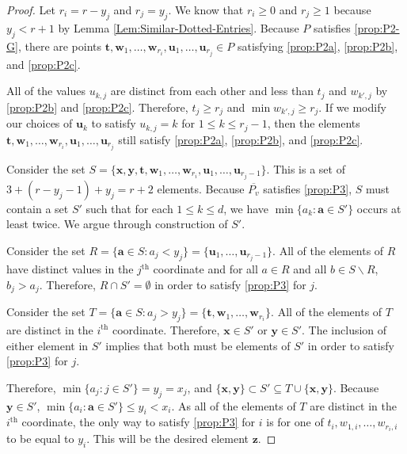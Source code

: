 \documentclass{amsart}
\begin{document}
	\begin{proof}
		Let $r_i = r - y_j$ and $r_j = y_j$. We know that $r_i \geq 0$ and $r_j \geq 1$ because $y_j < r+1$ by Lemma \ref{Lem:Similar-Dotted-Entries}. Because $P$ satisfies \ref{prop:P2-G}, there are points $\mathbf{t}, \mathbf{w}_1, \ldots, \mathbf{w}_{r_i}, \mathbf{u}_1, \ldots, \mathbf{u}_{r_j} \in P$ satisfying \ref{prop:P2a}, \ref{prop:P2b}, and \ref{prop:P2c}.
		
		All of the values $u_{k,j}$ are distinct from each other and less than $t_j$ and $w_{k',j}$ by \ref{prop:P2b} and \ref{prop:P2c}. Therefore, $t_j \geq r_j$ and $\min{w_{k',j}} \geq r_j$. If we modify our choices of $\mathbf{u}_{k}$ to satisfy $u_{k,j} = k$ for $1 \leq k \leq r_{j} - 1$, then the elements $\mathbf{t}, \mathbf{w}_1, \ldots, \mathbf{w}_{r_i}, \mathbf{u}_1, \ldots, \mathbf{u}_{r_j}$ still satisfy \ref{prop:P2a}, \ref{prop:P2b}, and \ref{prop:P2c}. 
		
		Consider the set $S = \{ \mathbf{x}, \mathbf{y}, \mathbf{t}, \mathbf{w}_1, \ldots, \mathbf{w}_{r_i}, \mathbf{u}_1, \ldots, \mathbf{u}_{r_j - 1} \}$. This is a set of $3 + (r - y_j - 1) + y_j = r+2$ elements. Because $\overline{P_v}$ satisfies \ref{prop:P3}, $S$ must contain a set $S'$ such that for each $1 \leq k \leq d$, we have $\min \{ a_k : \mathbf{a} \in S' \}$ occurs at least twice. We argue through construction of $S'$.
		
		Consider the set $R = \{ \mathbf{a} \in S : a_j < y_j \} = \{ \mathbf{u}_1, \ldots, \mathbf{u}_{r_j - 1} \}$. All of the elements of $R$ have distinct values in the $j^{\text{th}}$ coordinate and for all $a \in R$ and all $b \in S \backslash R$, $b_j > a_j$. Therefore, $R \cap S' = \emptyset$ in order to satisfy \ref{prop:P3} for $j$.
		
		Consider the set $T = \{ \mathbf{a} \in S : a_j > y_j \} = \{ \mathbf{t}, \mathbf{w}_1, \ldots, \mathbf{w}_{r_i} \}$. All of the elements of $T$ are distinct in the $i^{\text{th}}$ coordinate. Therefore, $\mathbf{x} \in S'$ or $\mathbf{y} \in S'$. The inclusion of either element in $S'$ implies that both must be elements of $S'$ in order to satisfy \ref{prop:P3} for $j$. 
		
		Therefore, $\min \{ a_j : j \in S' \} = y_j = x_j$, and $\{ \mathbf{x}, \mathbf{y} \} \subset S' \subseteq T \cup \{ \mathbf{x}, \mathbf{y} \}$. Because $\mathbf{y} \in S'$, $\min \{ a_i : \mathbf{a} \in S' \} \leq y_i < x_i$. As all of the elements of $T$ are distinct in the $i^{\text{th}}$ coordinate, the only way to satisfy \ref{prop:P3} for $i$ is for one of $t_i, w_{1,i}, \ldots, w_{r_i, i}$ to be equal to $y_i$. This will be the desired element $\mathbf{z}$.
	\end{proof}
	
\end{document}
